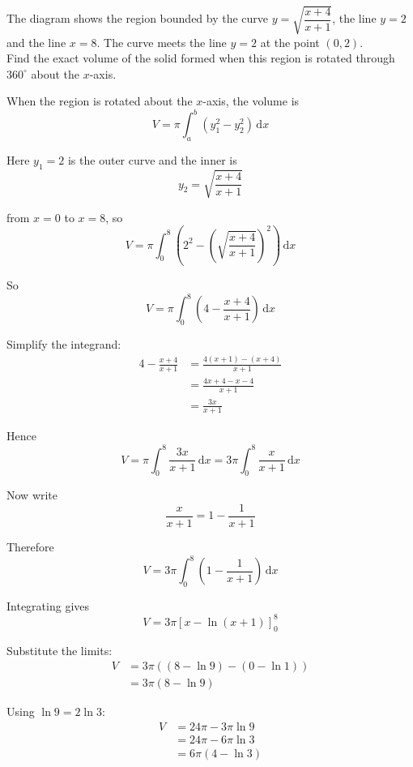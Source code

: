 \documentclass[leqno]{article}
\begin{document}
\begin{enumerate}[
  label=\textbf{\arabic*.},
  leftmargin=*,
  topsep=0pt,
  partopsep=0pt,
  parsep=0pt
]
\begin{figure}[H]
\end{figure}


The diagram shows the region bounded by the curve $y = \sqrt{\dfrac{x+4}{x+1}}$, the line $y = 2$ and the line $x = 8$. The curve meets the line $y = 2$ at the point $(0,2)$. \\

Find the exact volume of the solid formed when this region is rotated through $360^\circ$ about the $x$-axis. 

\vspace*{10pt}

\begin{djsSolution}
When the region is rotated about the $x$-axis, the volume is
\[
V=\pi\int_a^b \left(y_1^2-y_2^2\right)\,\mathrm{d}x
\]

Here $y_1=2$ is the outer curve and the inner is
\[
y_2=\sqrt{\frac{x+4}{x+1}}
\]

from $x=0$ to $x=8$, so
\[
V=\pi\int_0^8 \left(2^2-\left(\sqrt{\frac{x+4}{x+1}}\right)^2\right)\,\mathrm{d}x
\]

So
\[
V=\pi\int_0^8\left(4-\frac{x+4}{x+1}\right)\,\mathrm{d}x
\]

Simplify the integrand:
\begin{align*}
4-\frac{x+4}{x+1}
&=\frac{4(x+1)-(x+4)}{x+1} \\
&=\frac{4x+4-x-4}{x+1} \\
&=\frac{3x}{x+1}
\end{align*}

Hence
\[
V=\pi\int_0^8 \frac{3x}{x+1}\,\mathrm{d}x
=3\pi\int_0^8 \frac{x}{x+1}\,\mathrm{d}x
\]

Now write
\[
\frac{x}{x+1}=1-\frac{1}{x+1}
\]

Therefore
\[
V=3\pi\int_0^8\left(1-\frac{1}{x+1}\right)\,\mathrm{d}x
\]

Integrating gives
\[
V=3\pi\left[x-\ln(x+1)\right]_0^8
\]

Substitute the limits:
\begin{align*}
V&=3\pi\left((8-\ln 9)-(0-\ln 1)\right) \\
&=3\pi(8-\ln 9)
\end{align*}

Using $\ln 9=2\ln 3$:
\begin{align*}
V&=24\pi-3\pi\ln 9 \\
&=24\pi-6\pi\ln 3 \\
&=6\pi(4-\ln 3)
\end{align*}
\end{djsSolution}



\end{enumerate}
\end{document}
